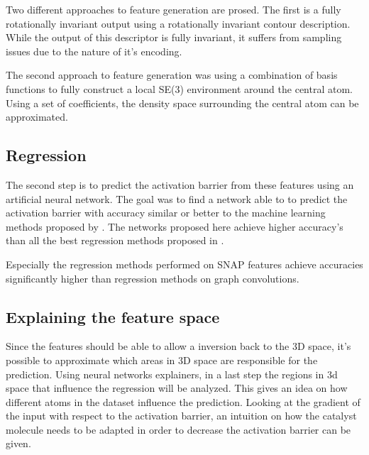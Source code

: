 Two different approaches to feature generation are prosed.
The first is a fully rotationally invariant output using a rotationally invariant contour description.
While the output of this descriptor is fully invariant, it suffers from sampling issues due to the nature of it's encoding.

The second approach to feature generation was using a combination of basis functions to fully construct a local SE(3) environment around the central atom.
Using a set of coefficients, the density space surrounding the central atom can be approximated.

\subsection{Regression}

The second step is to predict the activation barrier from these features using an artificial neural network.
The goal was to find a network able to to predict the activation barrier with accuracy similar or better to the machine learning methods proposed by \citeauthor{friederich_dos}.
The networks proposed here achieve higher accuracy's than all the best regression methods proposed in \cite{friederich_dos}.

Especially the regression methods performed on SNAP features achieve accuracies significantly higher than regression methods on graph convolutions.

\subsection{Explaining the feature space}
Since the features should be able to allow a inversion back to the 3D space, it's possible to approximate which areas in 3D space are responsible for the prediction.
Using neural networks explainers, in  a last step the regions in 3d space that influence the regression will be analyzed.
This gives an idea on how different atoms in the dataset influence the prediction.
Looking at the gradient of the input with respect to the activation barrier, an intuition on how the catalyst molecule needs to be 
adapted in order to decrease the activation barrier can be given.
